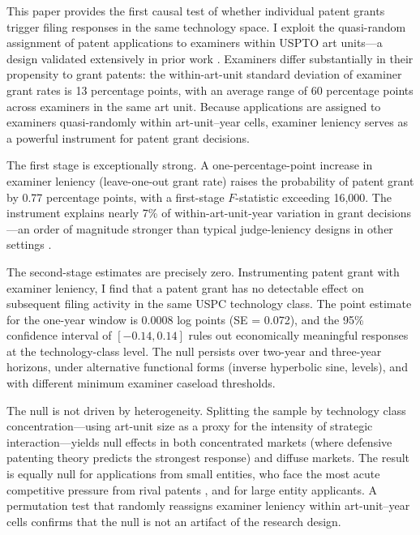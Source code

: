 \documentclass[12pt]{article}
\begin{document}
This paper provides the first causal test of whether individual patent grants trigger filing responses in the same technology space. I exploit the quasi-random assignment of patent applications to examiners within USPTO art units---a design validated extensively in prior work \citep{farre2020, sampat2019, galasso2015}. Examiners differ substantially in their propensity to grant patents: the within-art-unit standard deviation of examiner grant rates is 13 percentage points, with an average range of 60 percentage points across examiners in the same art unit. Because applications are assigned to examiners quasi-randomly within art-unit--year cells, examiner leniency serves as a powerful instrument for patent grant decisions.

The first stage is exceptionally strong. A one-percentage-point increase in examiner leniency (leave-one-out grant rate) raises the probability of patent grant by 0.77 percentage points, with a first-stage $F$-statistic exceeding 16,000. The instrument explains nearly 7\% of within-art-unit-year variation in grant decisions---an order of magnitude stronger than typical judge-leniency designs in other settings \citep{chyn2024}.

The second-stage estimates are precisely zero. Instrumenting patent grant with examiner leniency, I find that a patent grant has no detectable effect on subsequent filing activity in the same USPC technology class. The point estimate for the one-year window is 0.0008 log points (SE = 0.072), and the 95\% confidence interval of $[-0.14, 0.14]$ rules out economically meaningful responses at the technology-class level. The null persists over two-year and three-year horizons, under alternative functional forms (inverse hyperbolic sine, levels), and with different minimum examiner caseload thresholds.

The null is not driven by heterogeneity. Splitting the sample by technology class concentration---using art-unit size as a proxy for the intensity of strategic interaction---yields null effects in both concentrated markets (where defensive patenting theory predicts the strongest response) and diffuse markets. The result is equally null for applications from small entities, who face the most acute competitive pressure from rival patents \citep{ziedonis2004}, and for large entity applicants. A permutation test that randomly reassigns examiner leniency within art-unit--year cells confirms that the null is not an artifact of the research design.
\end{document}
